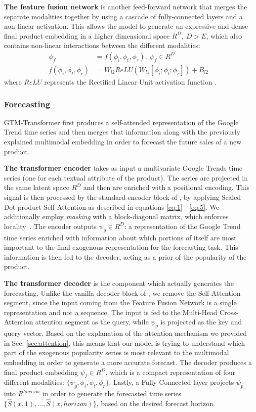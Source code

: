 \documentclass{article}
\newcommand{\approachname}[0] {GTM-Transformer\xspace}
\begin{document}
\textbf{The feature fusion network} is another feed-forward network that merges the separate modalities together by using a cascade of fully-connected layers and a non-linear activation. This allows the model to generate an expressive and dense final product embedding in a higher dimensional space $R^D,\: D > E$, which also contains non-linear interactions between the different modalities:
\begin{align}
     \psi_f & = f(\phi_i, \phi_t, \phi_r),\: \psi_f \in R^D \label{eq:9}\\
     f(\phi_i, \phi_t, \phi_r) & = W_{l2}ReLU(W_{l1}[\phi_i; \phi_t; \phi_r]) + B_{l2} \label{eq:10}
\end{align}
where $ReLU$ represents the Rectified Linear Unit activation function \cite{agarap_relu}.


\subsubsection{Forecasting}
\approachname{} first produces a self-attended representation of the Google Trend time series and then merges that information along with the previously explained multimodal embedding in order to forecast the future sales of a new product.

\textbf{The transformer encoder} takes as input a multivariate Google Trends time series (one for each textual attribute of the product). The series are projected in the same latent space $R^D$ and then are enriched with a positional encoding. This signal is then processed by the standard encoder block of \cite{vaswani2017attention}, by applying Scaled Dot-product Self-Attention as described in equations \ref{eq:1} - \ref{eq:5}. We additionally employ \emph{masking} with a block-diagonal matrix, which enforces locality~\cite{rae-razavi-2020-transformers}. The encoder outputs $\psi_g \in R^D$: a representation of the Google Trend time series enriched with information about which portions of itself are most important to the final exogenous representation for the forecasting task. This information is then fed to the decoder, acting as a prior of the popularity of the product.

\textbf{The transformer decoder} is the component which actually generates the forecasting. Unlike the vanilla decoder block of \cite{vaswani2017attention}, we remove the Self-Attention segment, since the input coming from the Feature Fusion Network is a single representation and not a sequence. The input is fed to the Multi-Head Cross-Attention attention segment as the query, while $\psi_g$ is projected as the key and query vector. Based on the explanation of the attention mechanism we provided in  Sec. \ref{sec:attention}, this means that our model is trying to understand which part of the exogenous popularity series is most relevant to the multimodal embedding in order to generate a more accurate forecast. The decoder produces a final product embedding $\psi_f \in R^D$, which is a compact representation of four different modalities: $\{\psi_g, \phi_i, \phi_t, \phi_r\}$. Lastly, a Fully Connected layer projects $\psi_p$ into $R^{horizon}$ in order to generate the forecasted time series $\{\hat{S}(x, 1),...,\hat{S}(x, horizon)\}$, based on the desired forecast horizon. 
\end{document}
